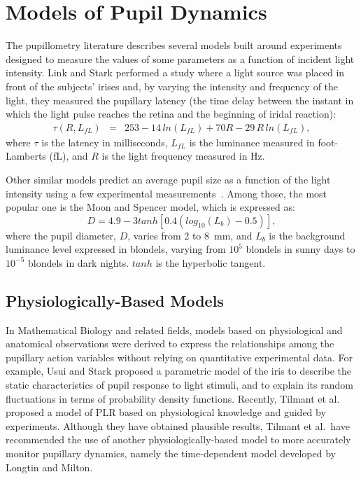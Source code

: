\documentclass{acmtog}
\begin{document}
\section{Models of Pupil Dynamics}
\label{sub:models_of_pupil_dynamics}

The pupillometry literature describes several models built around experiments designed to measure the values of some parameters as a function of incident light intensity. Link and Stark performed a study where a light source was placed in front of the subjects' irises and, by varying the intensity and frequency of the light, they measured the pupillary latency (the time delay between the instant in which the light pulse reaches the retina and the beginning of iridal reaction): 
\begin{eqnarray}
  \tau(R,L_{fL}) & = & 253 - 14\,{{ln}}(L_{fL}) + 70 R - 29\, R\, {{ln}}(L_{fL}), 
  \label{eq:Link_n_Stark}
\end{eqnarray}
where $\tau$ is the latency in milliseconds, $L_{fL}$ is the luminance measured in foot-Lamberts (fL), and $R$ is the
light frequency measured in Hz.

Other similar models predict an average pupil size as a function of the light intensity using  a few experimental
measurements~\cite{DC-1901}. Among those, the most popular one is the Moon and Spencer
model, which is expressed as:
\begin{equation}
\label{eq:moon}
 D = 4.9 - 3 {{tanh}}[0.4 ({{log}}_{10}(L_{b}) - 0.5)],
\end{equation}
where the pupil diameter, $D$, varies from 2 to 8~mm, and $L_{b}$ is the background luminance level expressed in blondels,
varying from $10^5$ blondels in sunny days to $10^{-5}$ blondels in dark nights. $tanh$ is the hyperbolic tangent. 

\subsection{Physiologically-Based Models}
\label{subsub:theoretical_models}
%
In Mathematical Biology and related fields, models based on physiological and anatomical observations were derived to express the relationships among the pupillary action variables without relying on quantitative experimental data. For example, Usui and Stark proposed a parametric model of the iris to describe the static characteristics of pupil response to light stimuli, and to explain its random fluctuations in terms of probability density functions. Recently, Tilmant {et al.} proposed a model of PLR based on physiological knowledge and guided by experiments. Although they have obtained plausible results, Tilmant {et al.}\ have recommended the use of another physiologically-based model to more accurately 
monitor pupillary dynamics, namely the time-dependent model developed by Longtin and Milton. 
\end{document}
